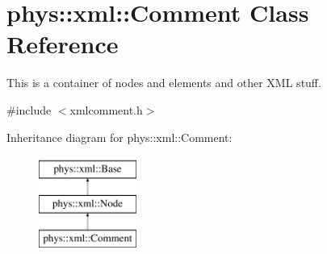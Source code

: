 \hypertarget{classphys_1_1xml_1_1Comment}{
\section{phys::xml::Comment Class Reference}
\label{d7/d0b/classphys_1_1xml_1_1Comment}
}


This is a container of nodes and elements and other XML stuff.  




{\ttfamily \#include $<$xmlcomment.h$>$}

Inheritance diagram for phys::xml::Comment:\begin{figure}[H]
\begin{center}
\leavevmode
\includegraphics[height=3.000000cm]{d7/d0b/classphys_1_1xml_1_1Comment}
\end{center}
\end{figure}

